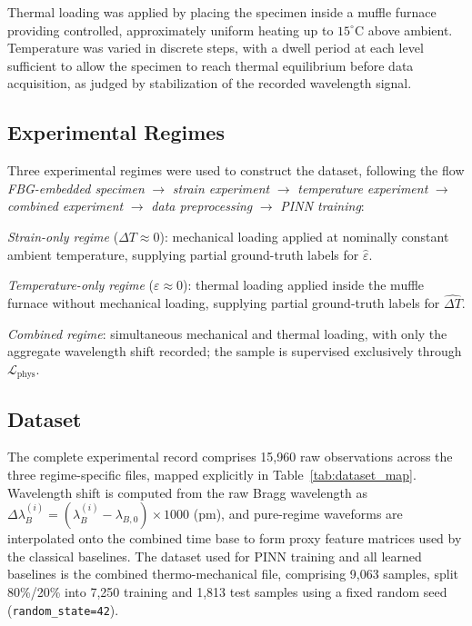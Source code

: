 \documentclass[journal,twoside,web]{ieeecolor}
\begin{document}
Thermal loading was applied by placing the specimen inside a muffle furnace
providing controlled, approximately uniform heating up to $15^\circ$C above
ambient. Temperature was varied in discrete steps, with a dwell period at
each level sufficient to allow the specimen to reach thermal equilibrium
before data acquisition, as judged by stabilization of the recorded
wavelength signal.

\subsection{Experimental Regimes}

Three experimental regimes were used to construct the dataset, following
the flow \emph{FBG-embedded specimen} $\rightarrow$ \emph{strain
experiment} $\rightarrow$ \emph{temperature experiment} $\rightarrow$
\emph{combined experiment} $\rightarrow$ \emph{data preprocessing}
$\rightarrow$ \emph{PINN training}:

\emph{Strain-only regime} ($\Delta T \approx 0$): mechanical loading applied
at nominally constant ambient temperature, supplying partial ground-truth
labels for $\hat\varepsilon$.

\emph{Temperature-only regime} ($\varepsilon \approx 0$): thermal loading
applied inside the muffle furnace without mechanical loading, supplying
partial ground-truth labels for $\widehat{\Delta T}$.

\emph{Combined regime}: simultaneous mechanical and thermal loading, with
only the aggregate wavelength shift recorded; the sample is supervised
exclusively through $\mathcal{L}_{\text{phys}}$.

\subsection{Dataset}
\label{subsec:dataset}

The complete experimental record comprises 15{,}960 raw observations across
the three regime-specific files, mapped explicitly in
Table~\ref{tab:dataset_map}. Wavelength shift is computed from the raw
Bragg wavelength as $\Delta\lambda_B^{(i)} = (\lambda_B^{(i)} -
\lambda_{B,0}) \times 1000$ (pm), and pure-regime waveforms are interpolated
onto the combined time base to form proxy feature matrices used by the
classical baselines. The dataset used for PINN training and all learned
baselines is the combined thermo-mechanical file, comprising 9{,}063
samples, split 80\%/20\% into 7{,}250 training and 1{,}813 test samples
using a fixed random seed (\texttt{random\_state=42}).
\end{document}
